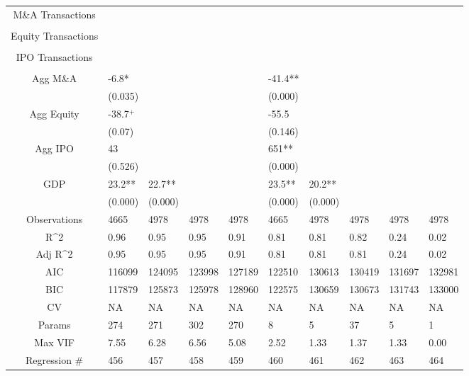 \documentclass{article}
\begin{document}
\begin{table}[H]
\begin{tabular}{|clllllllll|}
  M\&A Transactions &  &  &  &  &  &  &  &  &  \\ 
   &  &  &  &  &  &  &  &  &  \\ 
  Equity Transactions &  &  &  &  &  &  &  &  &  \\ 
   &  &  &  &  &  &  &  &  &  \\ 
  IPO Transactions &  &  &  &  &  &  &  &  &  \\ 
   &  &  &  &  &  &  &  &  &  \\ 
  Agg M\&A & -6.8* &  &  &  & -41.4** &  &  &  &  \\ 
   & (0.035) &  &  &  & (0.000) &  &  &  &  \\ 
  Agg Equity & -38.7$^{+}$ &  &  &  & -55.5 &  &  &  &  \\ 
   & (0.07) &  &  &  & (0.146) &  &  &  &  \\ 
  Agg IPO & 43 &  &  &  & 651** &  &  &  &  \\ 
   & (0.526) &  &  &  & (0.000) &  &  &  &  \\ 
  GDP & 23.2** & 22.7** &  &  & 23.5** & 20.2** &  &  &  \\ 
   & (0.000) & (0.000) &  &  & (0.000) & (0.000) &  &  &  \\ 
  \hline 
 Observations & 4665 & 4978 & 4978 & 4978 & 4665 & 4978 & 4978 & 4978 & 4978 \\ 
  R^2 & 0.96 & 0.95 & 0.95 & 0.91 & 0.81 & 0.81 & 0.82 & 0.24 & 0.02 \\ 
  Adj R^2 & 0.95 & 0.95 & 0.95 & 0.91 & 0.81 & 0.81 & 0.81 & 0.24 & 0.02 \\ 
  AIC & 116099 & 124095 & 123998 & 127189 & 122510 & 130613 & 130419 & 131697 & 132981 \\ 
  BIC & 117879 & 125873 & 125978 & 128960 & 122575 & 130659 & 130673 & 131743 & 133000 \\ 
  CV & NA & NA & NA & NA & NA & NA & NA & NA & NA \\ 
  Params & 274 & 271 & 302 & 270 & 8 & 5 & 37 & 5 & 1 \\ 
  Max VIF & 7.55 & 6.28 & 6.56 & 5.08 & 2.52 & 1.33 & 1.37 & 1.33 & 0.00 \\ 
  Regression \# & 456 & 457 & 458 & 459 & 460 & 461 & 462 & 463 & 464 \\ 
   \hline
\end{tabular}
 
\end{table}
\end{document}
